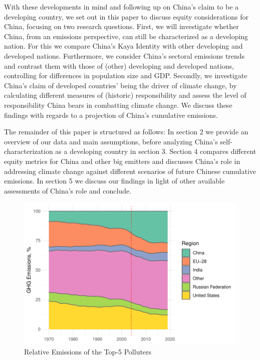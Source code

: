 \documentclass[
  12pt,
]{article}
\numberwithin{equation}{section}
\numberwithin{table}{section}
\numberwithin{figure}{section}
\begin{document}
With these developments in mind and following up on China's claim to be
a developing country, we set out in this paper to discuss equity
considerations for China, focusing on two research questions. First, we
will investigate whether China, from an emissions perspective, can still
be characterized as a developing nation. For this we compare China's
Kaya Identity with other developing and developed nations. Furthermore,
we consider China's sectoral emissions trends and contrast them with
those of (other) developing and developed nations, controlling for
differences in population size and GDP. Secondly, we investigate China's
claim of developed countries' being the driver of climate change, by
calculating different measures of (historic) responsibility and assess
the level of responsibility China bears in combatting climate change. We
discuss these findings with regards to a projection of China's
cumulative emissions.

The remainder of this paper is structured as follows: In section 2 we
provide an overview of our data and main assumptions, before analyzing
China's self-characterization as a developing country in section 3.
Section 4 compares different equity metrics for China and other big
emitters and discusses China's role in addressing climate change against
different scenarios of future Chinese cumulative emissions. In section 5
we discuss our findings in light of other available assessments of
China's role and conclude.

\begin{figure}
\centering
\includegraphics{Paper_files/figure-latex/unnamed-chunk-1-1.pdf}
\caption{Relative Emissions of the Top-5 Polluters}
\end{figure}
\end{document}

